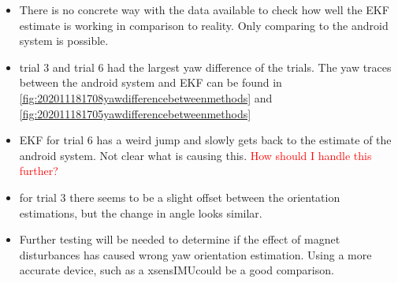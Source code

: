 \begin{itemize}
	\item There is no concrete way with the data available to check how well the EKF estimate is working in comparison to reality. Only comparing to the android system is possible.
	\item trial 3 and trial 6 had the largest yaw difference of the trials. The yaw traces between the android system and EKF can be found in \cref{fig:202011181708yawdifferencebetweenmethods} and \cref{fig:202011181705yawdifferencebetweenmethods}
	\item EKF for trial 6 has a weird jump and slowly gets back to the estimate of the android system. Not clear what is causing this. \textcolor{red}{How should I handle this further?}
	\item for trial 3 there seems to be a slight offset between the orientation estimations, but the change in angle looks similar.
	\item Further testing will be needed to determine if the effect of magnet disturbances has caused wrong yaw orientation estimation. Using a more accurate device, such as a xsens\ac{IMU}could be a good comparison.
\end{itemize}

